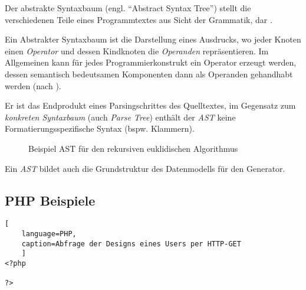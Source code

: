 \begin{thesisDefinition}
Der abstrakte Syntaxbaum (engl. \enquote{Abstract Syntax Tree}) stellt die verschiedenen Teile eines Programmtextes aus Sicht der Grammatik, dar \cite[][S. 9 ff.]{gruneCompiler}.
\end{thesisDefinition}
\begin{thesisDefinition}
Ein Abstrakter Syntaxbaum ist die Darstellung eines Ausdrucks, wo jeder Knoten einen \emph{Operator} und dessen Kindknoten die \emph{Operanden} repräsentieren.
Im Allgemeinen kann für jedes Programmierkonstrukt ein Operator erzeugt werden, dessen semantisch bedeutsamen Komponenten dann als Operanden gehandhabt werden (nach \cite[][S. 69]{ahoCompiler}).
\end{thesisDefinition}
Er ist das Endprodukt eines Parsingschrittes des Quelltextes, im Gegensatz zum \emph{konkreten Syntaxbaum} (auch \emph{Parse Tree}) enthält der \emph{AST} keine Formatierungsspezifische Syntax (bspw. Klammern). 

\begin{figure}[htb]
    \centering
        \centering
    \caption{Beispiel AST für den rekursiven euklidischen Algorithmus}
    \label{fig:ast}   
\end{figure}

Ein \emph{AST} bildet auch die Grundstruktur des Datenmodells für den Generator. 

\subsection{PHP Beispiele}

\begin{lstlisting}[
    language=PHP,
    caption=Abfrage der Designs eines Users per HTTP-GET
    ]
<?php

?>
\end{lstlisting}



